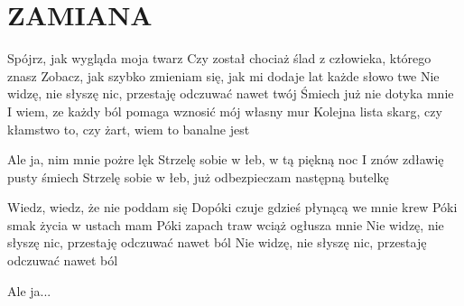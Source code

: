 \documentclass[../../../songbook.tex]{subfiles}
\begin{document}
\TabPositions{8cm} %
\section*{ZAMIANA}
{}
\vspace{0.5cm}
Spójrz, jak wygląda moja twarz							 \newline
Czy został chociaż ślad z człowieka, którego znasz		 \newline  
Zobacz, jak szybko zmieniam się, jak mi dodaje lat każde słowo twe				 \newline
Nie widzę, nie słyszę nic, przestaję odczuwać nawet twój	 \newline
Śmiech już nie dotyka mnie 							 \newline
I wiem, ze każdy ból pomaga wznosić mój własny mur							 \newline
Kolejna lista skarg, czy kłamstwo to, czy żart, wiem to banalne jest							 \newline

\-\hspace{1cm} Ale ja, nim mnie pożre lęk					 \newline
\-\hspace{1cm} Strzelę sobie w łeb, w tą piękną noc			 \newline
\-\hspace{1cm} I znów zdławię pusty śmiech 							 \newline
\-\hspace{1cm} Strzelę sobie w łeb, już odbezpieczam następną butelkę							 \newline

Wiedz, wiedz, że nie poddam się							 \newline
Dopóki czuje gdzieś płynącą we mnie krew							 \newline
Póki smak życia w ustach mam							 \newline
Póki zapach traw wciąż ogłusza mnie 							 \newline
Nie widzę, nie słyszę nic, przestaję odczuwać nawet ból			 \newline
Nie widzę, nie słyszę nic, przestaję odczuwać nawet ból			 \newline	
     
\-\hspace{1cm} Ale ja...							 \newline
	
\end{document}
